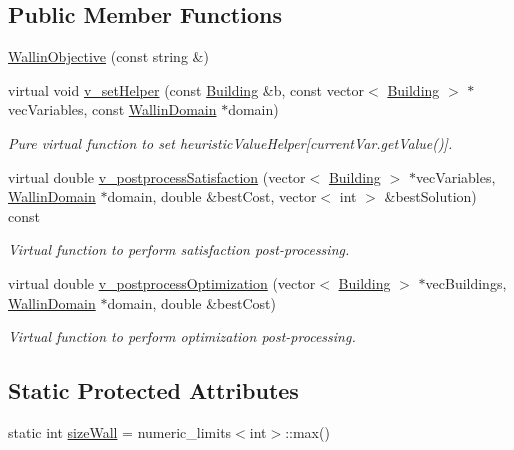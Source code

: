 \subsection*{Public Member Functions}
\begin{DoxyCompactItemize}
\item 
\hyperlink{classghost_1_1WallinObjective_a4730f5d345b053d92b9c55b5ebfe5716}{Wallin\-Objective} (const string \&)
\item 
virtual void \hyperlink{classghost_1_1WallinObjective_abc0f66adeebca9f9787a4ae348219fb8}{v\-\_\-set\-Helper} (const \hyperlink{classghost_1_1Building}{Building} \&b, const vector$<$ \hyperlink{classghost_1_1Building}{Building} $>$ $\ast$vec\-Variables, const \hyperlink{classghost_1_1WallinDomain}{Wallin\-Domain} $\ast$domain)
\begin{DoxyCompactList}\small\item\em Pure virtual function to set heuristic\-Value\-Helper\mbox{[}current\-Var.\-get\-Value()\mbox{]}. \end{DoxyCompactList}\item 
virtual double \hyperlink{classghost_1_1WallinObjective_acc06e32003541f6ed5c147d1353c852f}{v\-\_\-postprocess\-Satisfaction} (vector$<$ \hyperlink{classghost_1_1Building}{Building} $>$ $\ast$vec\-Variables, \hyperlink{classghost_1_1WallinDomain}{Wallin\-Domain} $\ast$domain, double \&best\-Cost, vector$<$ int $>$ \&best\-Solution) const 
\begin{DoxyCompactList}\small\item\em Virtual function to perform satisfaction post-\/processing. \end{DoxyCompactList}\item 
virtual double \hyperlink{classghost_1_1WallinObjective_aa30f157bc7a09fdfe2a671960e4e60df}{v\-\_\-postprocess\-Optimization} (vector$<$ \hyperlink{classghost_1_1Building}{Building} $>$ $\ast$vec\-Buildings, \hyperlink{classghost_1_1WallinDomain}{Wallin\-Domain} $\ast$domain, double \&best\-Cost)
\begin{DoxyCompactList}\small\item\em Virtual function to perform optimization post-\/processing. \end{DoxyCompactList}\end{DoxyCompactItemize}
\subsection*{Static Protected Attributes}
\begin{DoxyCompactItemize}
\item 
static int \hyperlink{classghost_1_1WallinObjective_aef1d7697ca6b29eccb4f3c62f42316ed}{size\-Wall} = numeric\-\_\-limits$<$int$>$\-::max()
\end{DoxyCompactItemize}
